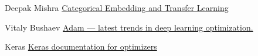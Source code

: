 \documentclass{article}
\begin{document}
\begin{thebibliography}{1}
Deepak Mishra
\newblock\href{https://towardsdatascience.com/categorical-embedding-and-transfer-learning-dd3c4af6345d}{Categorical Embedding and Transfer Learning}

Vitaly Bushaev
\newblock\href{https://towardsdatascience.com/adam-latest-trends-in-deep-learning-optimization-6be9a291375c}{Adam — latest trends in deep learning optimization.
}

Keras
\newblock\href{https://keras.io/optimizers/}{Keras documentation for optimizers}


\end{thebibliography}
\end{document}
